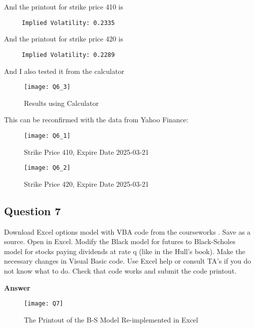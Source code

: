 \documentclass[letterpaper]{article}
\begin{document}
 And the printout for strike price 410 is
 
 \begin{minipage}{\linewidth}
 	\begin{Verbatim}
     Implied Volatility: 0.2335
 	\end{Verbatim}
 \end{minipage}
	 
 And the printout for strike price 420 is
 
	 \begin{minipage}{\linewidth}
	 	\begin{Verbatim}
     Implied Volatility: 0.2289
	 	\end{Verbatim}
	 \end{minipage}
 
 
	 And I also tested it from the calculator
	 
	 \begin{figure}[h]
	 	\caption{Results using Calculator}
	 	\centering
	 	\texttt{[image: Q6\_3]}
	 \end{figure}
 
	 This can be reconfirmed with the data from Yahoo Finance: 
	 
	 \begin{figure}[h]
	 	\caption{Strike Price 410, Expire Date 2025-03-21}
	 	\centering
	 	\texttt{[image: Q6\_1]}
	 \end{figure}
	 
	 \begin{figure}[h]
	 	\caption{Strike Price 420, Expire Date 2025-03-21}
	 	\centering
	 	\texttt{[image: Q6\_2]}
	 \end{figure}
	 
	 
 
	 \clearpage
	 \subsection*{Question 7}
	 Download Excel options model with VBA code from the courseworks . Save as a source. Open in Excel. Modify the Black model for futures to Black-Scholes model for stocks paying dividends at rate q (like in the Hull’s book). Make the necessary changes in Visual Basic code. Use Excel help or consult TA’s if you do not know what to do. Check that code works and submit the code printout.
	 
	 \textbf{Answer}
	 
	 	\begin{figure}[h]
	 		\caption{The Printout of the B-S Model Re-implemented in Excel}
	 	\centering
	 	\texttt{[image: Q7]}
	 \end{figure}
 
\end{document}

